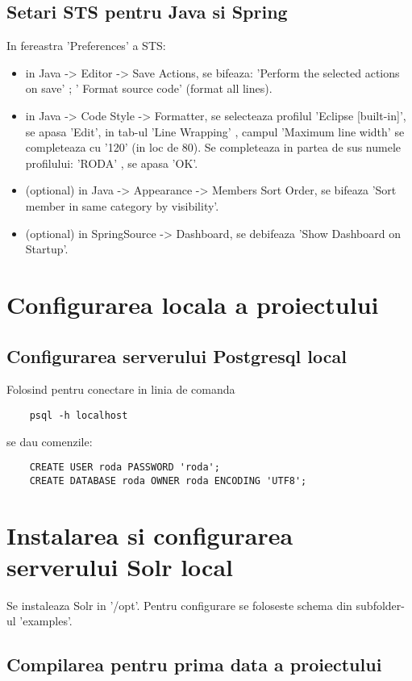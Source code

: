 \subsection{Setari STS pentru Java si Spring}
In fereastra 'Preferences' a STS:
\begin{itemize}
\item
in Java -> Editor -> Save Actions, se bifeaza: 'Perform the selected actions on save' ; ' Format source code' (format all lines).
\item
in Java -> Code Style -> Formatter, se selecteaza profilul 'Eclipse [built-in]', se apasa 'Edit', in tab-ul 'Line Wrapping' , campul 'Maximum line width' se completeaza cu '120' (in loc de 80).
Se completeaza in partea de sus numele profilului: 'RODA' , se apasa 'OK'.
\item
(optional) in Java -> Appearance -> Members Sort Order, se bifeaza 'Sort member in same category by visibility'.
\item
(optional) in SpringSource -> Dashboard, se debifeaza 'Show Dashboard on Startup'.
\end{itemize}

\section{Configurarea locala a proiectului}

\subsection{Configurarea serverului Postgresql local}
Folosind pentru conectare in linia de comanda
\begin{lstlisting}
	psql -h localhost
\end{lstlisting}
se dau comenzile:
\begin{lstlisting}
	CREATE USER roda PASSWORD 'roda';
	CREATE DATABASE roda OWNER roda ENCODING 'UTF8';
\end{lstlisting}

\section{Instalarea si configurarea serverului Solr local}

Se instaleaza Solr in '/opt'.
Pentru configurare se foloseste schema din subfolder-ul
'examples'. 

\subsection{Compilarea pentru prima data a proiectului}

